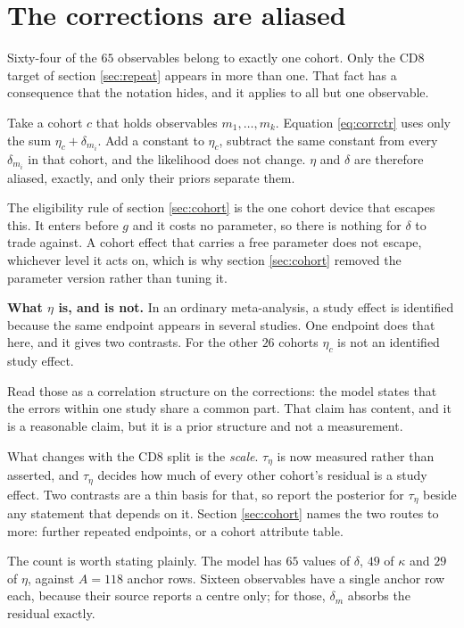 \documentclass[11pt]{article}
\begin{document}
\section{The corrections are aliased}
\label{sec:alias}

Sixty-four of the $65$ observables belong to exactly one cohort. Only the CD8
target of section \ref{sec:repeat} appears in more than one. That fact has a
consequence that the notation hides, and it applies to all but one observable.

Take a cohort $c$ that holds observables $m_1,\dots,m_k$. Equation
\eqref{eq:corrctr} uses only the sum $\eta_c+\delta_{m_i}$. Add a constant to
$\eta_c$, subtract the same constant from every $\delta_{m_i}$ in that cohort,
and the likelihood does not change. $\eta$ and $\delta$ are therefore aliased,
exactly, and only their priors separate them.

The eligibility rule of section \ref{sec:cohort} is the one cohort device that
escapes this. It enters before $g$ and it costs no parameter, so there is nothing
for $\delta$ to trade against. A cohort effect that carries a free parameter does
not escape, whichever level it acts on, which is why section \ref{sec:cohort}
removed the parameter version rather than tuning it.

\begin{assumpbox}
\textbf{What $\eta$ is, and is not.} In an ordinary meta-analysis, a study
effect is identified because the same endpoint appears in several studies. One
endpoint does that here, and it gives two contrasts. For the other $26$ cohorts
$\eta_c$ is not an identified study effect.

Read those as a correlation structure on the corrections: the model states that
the errors within one study share a common part. That claim has content, and it
is a reasonable claim, but it is a prior structure and not a measurement.

What changes with the CD8 split is the \emph{scale}. $\tau_\eta$ is now measured
rather than asserted, and $\tau_\eta$ decides how much of every other cohort's
residual is a study effect. Two contrasts are a thin basis for that, so report
the posterior for $\tau_\eta$ beside any statement that depends on it. Section
\ref{sec:cohort} names the two routes to more: further repeated endpoints, or a
cohort attribute table.
\end{assumpbox}

The count is worth stating plainly. The model has $65$ values of $\delta$, $49$
of $\kappa$ and $29$ of $\eta$, against $A=118$ anchor rows. Sixteen observables
have a single anchor row each, because their source reports a centre only; for
those, $\delta_m$ absorbs the residual exactly.
\end{document}
